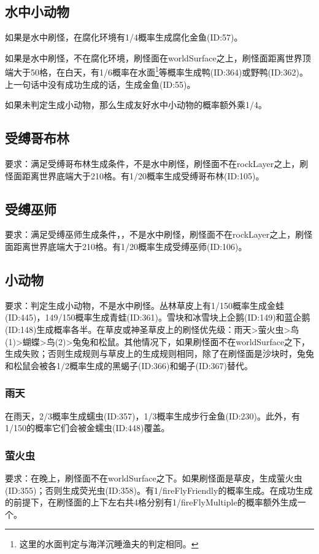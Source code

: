 \subsection{水中小动物}
如果是水中刷怪，在腐化环境有1/4概率生成腐化金鱼(ID:57)。

如果是水中刷怪，不在腐化环境，刷怪面在worldSurface之上，刷怪面距离世界顶端大于50格，在白天，有1/6概率在水面\footnote{这里的水面判定与海洋沉睡渔夫的判定相同。}等概率生成鸭(ID:364)或野鸭(ID:362)。上一句话中没有成功生成的话，生成金鱼(ID:55)。

如果未判定生成小动物，那么生成友好水中小动物的概率额外乘1/4。

\subsection{受缚哥布林}
要求：满足受缚哥布林生成条件，不是水中刷怪，刷怪面不在rockLayer之上，刷怪面距离世界底端大于210格。有1/20概率生成受缚哥布林(ID:105)。

\subsection{受缚巫师}
要求：满足受缚巫师生成条件，，不是水中刷怪，刷怪面不在rockLayer之上，刷怪面距离世界底端大于210格。有1/20概率生成受缚巫师(ID:106)。

\subsection{小动物}
要求：判定生成小动物，不是水中刷怪。丛林草皮上有1/150概率生成金蛙(ID:445)，149/150概率生成青蛙(ID:361)。雪块和冰雪块上企鹅(ID:149)和蓝企鹅(ID:148)生成概率各半。在草皮或神圣草皮上的刷怪优先级：雨天>萤火虫>鸟(1)>蝴蝶>鸟(2)>兔兔和松鼠。其他情况下，如果刷怪面不在worldSurface之下，生成失败；否则生成规则与草皮上的生成规则相同，除了在刷怪面是沙块时，兔兔和松鼠会被各1/2概率生成的黑蝎子(ID:366)和蝎子(ID:367)替代。

\subsubsection{雨天}
在雨天，2/3概率生成蠕虫(ID:357)，1/3概率生成步行金鱼(ID:230)。此外，有1/150的概率它们会被金蠕虫(ID:448)覆盖。

\subsubsection{萤火虫}
要求：在晚上，刷怪面不在worldSurface之下。如果刷怪面是草皮，生成萤火虫(ID:355)；否则生成荧光虫(ID:358)。有1/fireFlyFriendly的概率生成。在成功生成的前提下，在刷怪面的上下左右共4格分别有1/fireFlyMultiple的概率额外生成一个。

